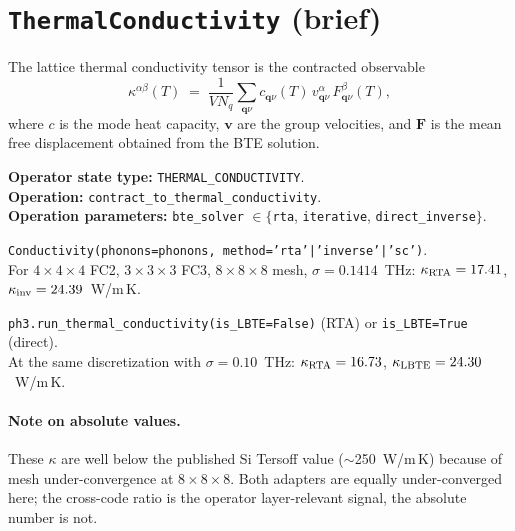 \documentclass[11pt,a4paper]{article}
\begin{document}
\section{\texttt{ThermalConductivity} (brief)}

\begin{abstractbox}
The lattice thermal conductivity tensor is the contracted observable
\begin{equation}
  \kappa^{\alpha\beta}(T)
  \;=\; \frac{1}{V N_q} \sum_{\mathbf{q}\nu} c_{\mathbf{q}\nu}(T)\,
        v^\alpha_{\mathbf{q}\nu}\,F^\beta_{\mathbf{q}\nu}(T),
\end{equation}
where $c$ is the mode heat capacity, $\mathbf{v}$ are the group velocities, and
$\mathbf{F}$ is the mean free displacement obtained from the BTE solution.

\medskip
\textbf{Operator state type:} \texttt{THERMAL\_CONDUCTIVITY}.\\
\textbf{Operation:} \texttt{contract\_to\_thermal\_conductivity}.\\
\textbf{Operation parameters:} \texttt{bte\_solver} $\in \{$\texttt{rta}, \texttt{iterative},
\texttt{direct\_inverse}$\}$.
\end{abstractbox}

\begin{kaldobox}
\texttt{Conductivity(phonons=phonons, method='rta'|'inverse'|'sc')}.\\
For $4{\times}4{\times}4$ FC2, $3{\times}3{\times}3$ FC3, $8{\times}8{\times}8$ mesh,
$\sigma=0.1414$~THz: $\kappa_{\rm RTA} = 17.41$, $\kappa_{\rm inv} = 24.39$~W/m\,K.
\end{kaldobox}

\begin{phonobox}
\texttt{ph3.run\_thermal\_conductivity(is\_LBTE=False)} (RTA) or
\texttt{is\_LBTE=True} (direct).\\
At the same discretization with $\sigma=0.10$~THz: $\kappa_{\rm RTA} = 16.73$,
$\kappa_{\rm LBTE} = 24.30$~W/m\,K.
\end{phonobox}

\paragraph{Note on absolute values.} These $\kappa$ are well below the published Si
Tersoff value ($\sim$250~W/m\,K) because of mesh under-convergence at
$8{\times}8{\times}8$. Both adapters are equally under-converged here; the cross-code
ratio is the operator layer-relevant signal, the absolute number is not.
\end{document}
